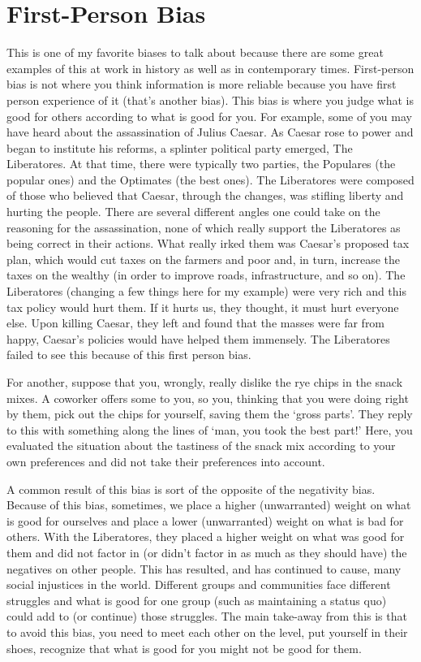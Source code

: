 \section{First-Person Bias}

This is one of my favorite biases to talk about because there are some great examples of this at work in history as well as in contemporary times. First-person bias is not where you think information is more reliable because you have first person experience of it (that's another bias). This bias is where you judge what is good for others according to what is good for you. For example, some of you may have heard about the assassination of Julius Caesar. As Caesar rose to power and began to institute his reforms, a splinter political party emerged, The Liberatores. At that time, there were typically two parties, the Populares (the popular ones) and the Optimates (the best ones). The Liberatores were composed of those who believed that Caesar, through the changes, was stifling liberty and hurting the people. There are several different angles one could take on the reasoning for the assassination, none of which really support the Liberatores as being correct in their actions. What really irked them was Caesar's proposed tax plan, which would cut taxes on the farmers and poor and, in turn, increase the taxes on the wealthy (in order to improve roads, infrastructure, and so on). The Liberatores (changing a few things here for my example) were very rich and this tax policy would hurt them. If it hurts us, they thought, it must hurt everyone else. Upon killing Caesar, they left and found that the masses were far from happy, Caesar's policies would have helped them immensely. The Liberatores failed to see this because of this first person bias. 

For another, suppose that you, wrongly, really dislike the rye chips in the snack mixes. A coworker offers some to you, so you, thinking that you were doing right by them, pick out the chips for yourself, saving them the `gross parts'. They reply to this with something along the lines of `man, you took the best part!' Here, you evaluated the situation about the tastiness of the snack mix according to your own preferences and did not take their preferences into account.

A common result of this bias is sort of the opposite of the negativity bias. Because of this bias, sometimes, we place a higher (unwarranted) weight on what is good for ourselves and place a lower (unwarranted) weight on what is bad for others. With the Liberatores, they placed a higher weight on what was good for them and did not factor in (or didn't factor in as much as they should have) the negatives on other people. This has resulted, and has continued to cause, many social injustices in the world. Different groups and communities face different struggles and what is good for one group (such as maintaining a status quo) could add to (or continue) those struggles. The main take-away from this is that to avoid this bias, you need to meet each other on the level, put yourself in their shoes, recognize that what is good for you might not be good for them.

